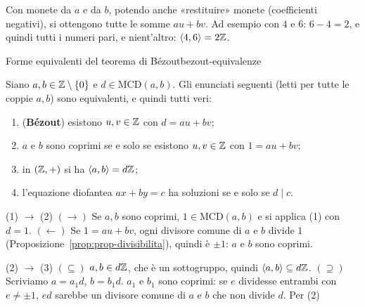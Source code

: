 \begin{spiegazione}
    Con monete da $a$ e da $b$, potendo anche «restituire» monete (coefficienti negativi), si ottengono tutte le somme $au + bv$.
    Ad esempio con $4$ e $6$: $6 - 4 = 2$, e quindi tutti i numeri pari, e nient'altro: $\langle 4, 6 \rangle = 2\mathbb{Z}$.
\end{spiegazione}

\begin{concetto}
\begin{Teorema}{Forme equivalenti del teorema di Bézout}{bezout-equivalenze}
    \begin{prerequisiti}
    \end{prerequisiti}
    Siano $a, b \in \mathbb{Z} \setminus \{0\}$ e $d \in \mathrm{MCD}(a, b)$. Gli enunciati seguenti (letti per tutte le coppie $a, b$) sono equivalenti, e
    quindi tutti veri:
    \begin{enumerate}
        \item (\textbf{Bézout}) esistono $u, v \in \mathbb{Z}$ con $d = au + bv$;
        \item $a$ e $b$ sono coprimi se e solo se esistono $u, v \in \mathbb{Z}$ con $1 = au + bv$;
        \item in $(\mathbb{Z}, +)$ si ha $\langle a, b \rangle = d\mathbb{Z}$;
        \item l'equazione diofantea $ax + by = c$ ha soluzioni se e solo se $d \mid c$.
    \end{enumerate}
\end{Teorema}
\begin{dimostrazione}
    \begin{caso}{(1) $\rightarrow$ (2)}
        $(\rightarrow)$ Se $a, b$ sono coprimi, $1 \in \mathrm{MCD}(a, b)$ e si applica (1) con $d = 1$. $(\leftarrow)$ Se $1 = au + bv$, ogni divisore comune
        di $a$ e $b$ divide $1$ (Proposizione~\ref{prop:prop-divisibilita}), quindi è $\pm 1$: $a$ e $b$ sono coprimi.
    \end{caso}
    \begin{caso}{(2) $\rightarrow$ (3)}
        $(\subseteq)$ $a, b \in d\mathbb{Z}$, che è un sottogruppo, quindi $\langle a, b \rangle \subseteq d\mathbb{Z}$. $(\supseteq)$ Scriviamo $a = a_1 d$, $b = b_1 d$.
        $a_1$ e $b_1$ sono coprimi: se $e$ dividesse entrambi con $e \neq \pm 1$, $ed$ sarebbe un divisore comune di $a$ e $b$ che non divide $d$. Per (2)

\end{caso}
\end{dimostrazione}
\end{concetto}
